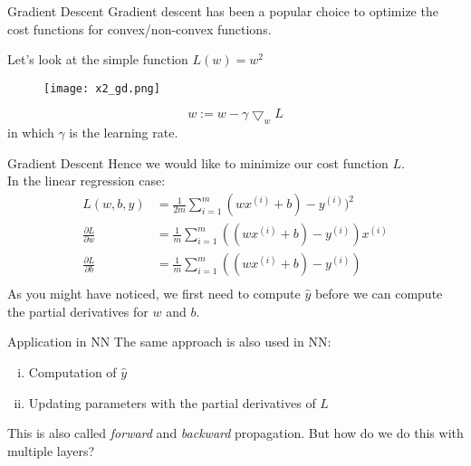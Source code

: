 \documentclass{beamer}
\begin{document}
\begin{frame}[t]{Gradient Descent}
  Gradient descent has been a popular choice to optimize the cost functions for convex/non-convex functions.

  Let's look at the simple function $L(w) = w^2$
  \begin{figure}[htpb]
    \centering
    \texttt{[image: x2\_gd.png]}
  \end{figure}
  \begin{equation}
    w := w - \gamma \bigtriangledown_wL
  \end{equation}
  in which $\gamma$ is the learning rate.
\end{frame}

\begin{frame}[t]{Gradient Descent}
  Hence we would like to minimize our cost function $L$.
  \\
  In the linear regression case:
  \begin{equation}
    \begin{align*}
      L(w, b, y) &= \frac{1}{2m} \sum^m_{i=1} (wx^{(i)}+b) - y^{(i)})^2 \\
      \frac{\partial L}{\partial w} &= \frac{1}{m} \sum^m_{i=1} ((wx^{(i)}+b) - y^{(i)})x^{(i)} \\
      \frac{\partial L}{\partial b} &= \frac{1}{m} \sum^m_{i=1} ((wx^{(i)}+b) - y^{(i)}) \\
    \end{align}
  \end{equation}
  As you might have noticed, we first need to compute $\hat{y}$ before we can compute the partial derivatives for $w$ and $b$.
\end{frame}

\begin{frame}[t]{Application in NN}
  The same approach is also used in NN:
  \begin{enumerate}[(i)]
    \item Computation of $\hat{y}$ 
    \item Updating parameters with the partial derivatives of $L$
  \end{enumerate}
  This is also called \emph{forward} and \emph{backward} propagation.
  But how do we do this with multiple layers?
\end{frame}
\end{document}
